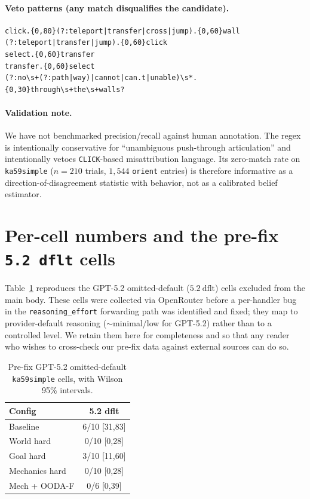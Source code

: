 \documentclass{article}
\begin{document}
\paragraph{Veto patterns (any match disqualifies the candidate).}
\begin{verbatim}
click.{0,80}(?:teleport|transfer|cross|jump).{0,60}wall
(?:teleport|transfer|jump).{0,60}click
select.{0,60}transfer
transfer.{0,60}select
(?:no\s+(?:path|way)|cannot|can.t|unable)\s*.{0,30}through\s+the\s+walls?
\end{verbatim}

\paragraph{Validation note.}
We have not benchmarked precision/recall against human annotation. The regex is intentionally conservative for ``unambiguous push-through articulation'' and intentionally vetoes \texttt{CLICK}-based misattribution language. Its zero-match rate on \texttt{ka59simple} ($n=210$ trials, $1{,}544$ \texttt{orient} entries) is therefore informative as a direction-of-disagreement statistic with behavior, not as a calibrated belief estimator.

\section{Per-cell numbers and the pre-fix \texttt{5.2 dflt} cells}
\label{app:cells}
Table~\ref{tab:dflt-cells} reproduces the GPT-5.2 omitted-default ($5.2~\text{dflt}$) cells excluded from the main body. These cells were collected via OpenRouter before a per-handler bug in the \texttt{reasoning\_effort} forwarding path was identified and fixed; they map to provider-default reasoning ($\sim$minimal/low for GPT-5.2) rather than to a controlled level. We retain them here for completeness and so that any reader who wishes to cross-check our pre-fix data against external sources can do so.

\begin{table}[h]
  \small
  \setlength{\tabcolsep}{4pt}
  \caption{Pre-fix GPT-5.2 omitted-default \texttt{ka59simple} cells, with Wilson 95\% intervals.}
  \label{tab:dflt-cells}
  \centering
  \begin{tabular}{lc}
    \toprule
    Config & 5.2 dflt \\
    \midrule
    Baseline       & 6/10 [31,83] \\
    World hard     & 0/10 [0,28] \\
    Goal hard      & 3/10 [11,60] \\
    Mechanics hard & 0/10 [0,28] \\
    Mech + OODA-F  & 0/6 [0,39] \\
    \bottomrule
  \end{tabular}
\end{table}
\end{document}
